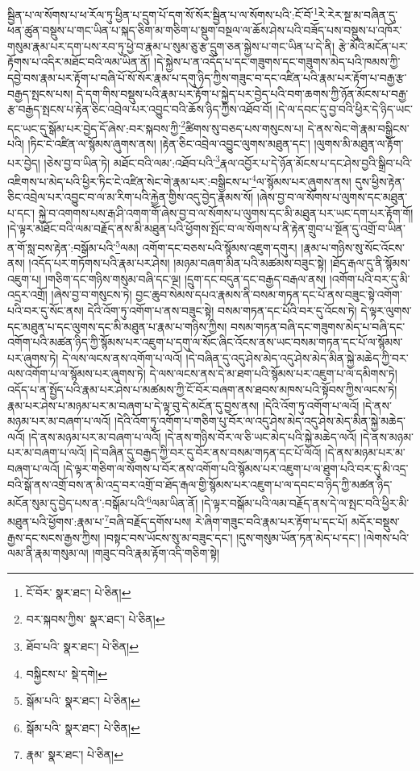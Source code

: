 སྦྱིན་པ་ལ་སོགས་པ་ཕ་རོལ་ཏུ་ཕྱིན་པ་དྲུག་པོ་དག་སོ་སོར་སྦྱིན་པ་ལ་སོགས་པའི་:ངོ་བོ་\footnote{ངོ་བོར་  སྣར་ཐང་།  པེ་ཅིན། }རེ་རེར་སྔ་མ་བཞིན་དུ་ཕན་ཚུན་བསྡུས་པ་གང་ཡིན་པ་སྐད་ཅིག་མ་གཅིག་པ་སྡུག་བསྔལ་ལ་ཆོས་ཤེས་པའི་བཟོད་པས་བསྡུས་པ་འཁོར་གསུམ་རྣམ་པར་དག་པས་རབ་ཏུ་ཕྱེ་བ་རྣམ་པ་སུམ་ཅུ་རྩ་དྲུག་ཅན་སྐྱེས་པ་གང་ཡིན་པ་དེ་ནི། རྩེ་མོའི་མངོན་པར་རྟོགས་པ་འདིར་མཐོང་བའི་ལམ་ཡིན་ནོ། །དེ་སྐྱེས་པ་ན་འདོད་པ་དང་གཟུགས་དང་གཟུགས་མེད་པའི་ཁམས་ཀྱི་དབྱེ་བས་རྣམ་པར་རྟོག་པ་བཞི་པོ་སོ་སོར་རྣམ་པ་དགུ་ཉིད་ཀྱིས་གཟུང་བ་དང་འཛིན་པའི་རྣམ་པར་རྟོག་པ་བརྒྱ་རྩ་བརྒྱད་སྤངས་པས། དེ་དག་གིས་བསྡུས་པའི་རྣམ་པར་རྟོག་པ་སྐྱེད་པར་བྱེད་པའི་བག་ཆགས་ཀྱི་ཉོན་མོངས་པ་བརྒྱ་རྩ་བརྒྱད་སྤངས་པ་རྟེན་ཅིང་འབྲེལ་པར་འབྱུང་བའི་ཆོས་ཉིད་ཀྱིས་འཐོབ་བོ། །དེ་ལ་དབང་དུ་བྱ་བའི་ཕྱིར་དེ་ཉིད་ཡང་དང་ཡང་དུ་སྒོམ་པར་བྱེད་དོ་ཞེས་:བར་སྐབས་ཀྱི་\footnote{བར་སྐབས་ཀྱིས་  སྣར་ཐང་།  པེ་ཅིན། }ཚིགས་སུ་བཅད་པས་གསུངས་པ། དེ་ནས་སེང་གེ་རྣམ་བསྒྱིངས་པའི། །ཏིང་ངེ་འཛིན་ལ་སྙོམས་ཞུགས་ནས། །རྟེན་ཅིང་འབྲེལ་འབྱུང་ལུགས་མཐུན་དང་། །ལུགས་མི་མཐུན་ལ་རྟོག་པར་བྱེད། །ཅེས་བྱ་བ་ཡིན་ཏེ། མཐོང་བའི་ལམ་:འཐོབ་པའི་\footnote{ཐོབ་པའི་  སྣར་ཐང་།  པེ་ཅིན། }རྣལ་འབྱོར་པ་དེ་ཉོན་མོངས་པ་དང་ཤེས་བྱའི་སྒྲིབ་པའི་འཇིགས་པ་མེད་པའི་ཕྱིར་ཏིང་ངེ་འཛིན་སེང་གེ་རྣམ་པར་:བསྒྱིངས་པ་\footnote{བསྐྱིངས་པ་  སྡེ་དགེ། }ལ་སྙོམས་པར་ཞུགས་ནས། དུས་ཕྱིས་རྟེན་ཅིང་འབྲེལ་པར་འབྱུང་བ་ལ་མ་རིག་པའི་རྐྱེན་གྱིས་འདུ་བྱེད་རྣམས་སོ། །ཞེས་བྱ་བ་ལ་སོགས་པ་ལུགས་དང་མཐུན་པ་དང་། སྐྱེ་བ་འགགས་པས་རྒ་ཤི་འགག་གོ་ཞེས་བྱ་བ་ལ་སོགས་པ་ལུགས་དང་མི་མཐུན་པར་ཡང་དག་པར་རྟོག་གོ། །དེ་ལྟར་མཐོང་བའི་ལམ་བརྗོད་ནས་མི་མཐུན་པའི་ཕྱོགས་སྤོང་བ་ལ་སོགས་པ་ནི་རྟེན་གྲུབ་པ་སྔོན་དུ་འགྲོ་བ་ཡིན་ན་གོ་སླ་བས་རྟེན་:བསྒོམ་པའི་\footnote{སྒོམ་པའི་  སྣར་ཐང་།  པེ་ཅིན། }ལམ། འགོག་དང་བཅས་པའི་སྙོམས་འཇུག་དགུར། །རྣམ་པ་གཉིས་སུ་སོང་འོངས་ནས། །འདོད་པར་གཏོགས་པའི་རྣམ་པར་ཤེས། །མཉམ་བཞག་མིན་པའི་མཚམས་བཟུང་སྟེ། །ཐོད་རྒལ་དུ་ནི་སྙོམས་འཇུག་པ། །གཅིག་དང་གཉིས་གསུམ་བཞི་དང་ལྔ། །དྲུག་དང་བདུན་དང་བརྒྱད་བརྒལ་ནས། །འགོག་པའི་བར་དུ་མི་འདྲར་འགྲོ། །ཞེས་བྱ་བ་གསུངས་ཏེ། བྱང་ཆུབ་སེམས་དཔའ་རྣམས་ནི་བསམ་གཏན་དང་པོ་ནས་བཟུང་སྟེ་འགོག་པའི་བར་དུ་སོང་ནས། དེའི་འོག་ཏུ་འགོག་པ་ནས་བཟུང་སྟེ། བསམ་གཏན་དང་པོའི་བར་དུ་འོངས་ཏེ། དེ་ལྟར་ལུགས་དང་མཐུན་པ་དང་ལུགས་དང་མི་མཐུན་པ་རྣམ་པ་གཉིས་ཀྱིས། བསམ་གཏན་བཞི་དང་གཟུགས་མེད་པ་བཞི་དང་འགོག་པའི་མཚན་ཉིད་ཀྱི་སྙོམས་པར་འཇུག་པ་དགུ་ལ་སོང་ཞིང་འོངས་ནས་ཡང་བསམ་གཏན་དང་པོ་ལ་སྙོམས་པར་ཞུགས་ཏེ། དེ་ལས་ལངས་ནས་འགོག་པ་ལའོ། །དེ་བཞིན་དུ་འདུ་ཤེས་མེད་འདུ་ཤེས་མེད་མིན་སྐྱེ་མཆེད་ཀྱི་བར་ལས་འགོག་པ་ལ་སྙོམས་པར་ཞུགས་ཏེ། དེ་ལས་ལངས་ནས་དེ་མ་ཐག་པའི་སྙོམས་པར་འཇུག་པ་ལ་དམིགས་ཏེ། འདོད་པ་ན་སྤྱོད་པའི་རྣམ་པར་ཤེས་པ་མཚམས་ཀྱི་ངོ་བོར་བཞག་ནས་ཐབས་མཁས་པའི་སྟོབས་ཀྱིས་ལངས་ཏེ། རྣམ་པར་ཤེས་པ་མཉམ་པར་མ་བཞག་པ་དེ་ལྟ་བུ་དེ་མངོན་དུ་བྱས་ནས། །དེའི་འོག་ཏུ་འགོག་པ་ལའོ། །དེ་ནས་མཉམ་པར་མ་བཞག་པ་ལའོ། །དེའི་འོག་ཏུ་འགོག་པ་གཅིག་པུ་བོར་ལ་འདུ་ཤེས་མེད་འདུ་ཤེས་མེད་མིན་སྐྱེ་མཆེད་ལའོ། །དེ་ནས་མཉམ་པར་མ་བཞག་པ་ལའོ། །དེ་ནས་གཉིས་བོར་ལ་ཅི་ཡང་མེད་པའི་སྐྱེ་མཆེད་ལའོ། །དེ་ནས་མཉམ་པར་མ་བཞག་པ་ལའོ། །དེ་བཞིན་དུ་བརྒྱད་ཀྱི་བར་དུ་བོར་ནས་བསམ་གཏན་དང་པོ་ལའོ། །དེ་ནས་མཉམ་པར་མ་བཞག་པ་ལའོ། །དེ་ལྟར་གཅིག་ལ་སོགས་པ་བོར་ནས་འགོག་པའི་སྙོམས་པར་འཇུག་པ་ལ་ཐུག་པའི་བར་དུ་མི་འདྲ་བའི་སྒོ་ནས་འགྲོ་བས་ན་མི་འདྲ་བར་འགྲོ་བ་ཐོད་རྒལ་གྱི་སྙོམས་པར་འཇུག་པ་ལ་དབང་བ་ཉིད་ཀྱི་མཚན་ཉིད་མངོན་སུམ་དུ་བྱེད་པས་ན་:བསྒོམ་པའི་\footnote{སྒོམ་པའི་  སྣར་ཐང་།  པེ་ཅིན། }ལམ་ཡིན་ནོ། །དེ་ལྟར་བསྒོམ་པའི་ལམ་བརྗོད་ནས་དེ་ལ་སྤང་བའི་ཕྱིར་མི་མཐུན་པའི་ཕྱོགས་:རྣམ་པ་\footnote{རྣམ་  སྣར་ཐང་།  པེ་ཅིན། }བཞི་བརྗོད་དགོས་པས། རེ་ཞིག་གཟུང་བའི་རྣམ་པར་རྟོག་པ་དང་པོ། མདོར་བསྡུས་རྒྱས་དང་སངས་རྒྱས་ཀྱིས། །བསྟང་བས་ཡོངས་སུ་མ་བཟུང་དང་། །དུས་གསུམ་ཡོན་ཏན་མེད་པ་དང་། །ལེགས་པའི་ལམ་ནི་རྣམ་གསུམ་ལ། །གཟུང་བའི་རྣམ་རྟོག་འདི་གཅིག་སྟེ། 
